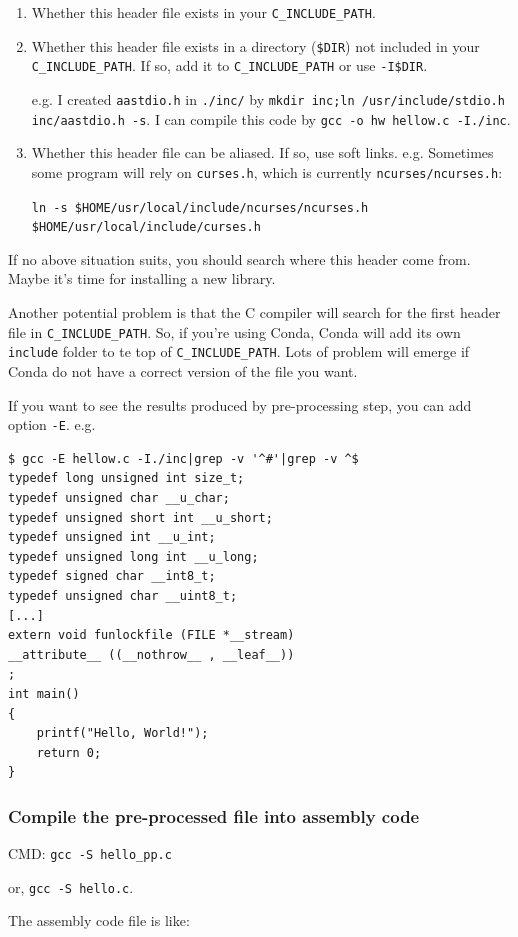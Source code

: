 \documentclass[]{article}
\begin{document}
\begin{enumerate}
\item Whether this header file exists in your \verb|C_INCLUDE_PATH|.
\item Whether this header file exists in a directory (\verb|$DIR|) not included in your \verb|C_INCLUDE_PATH|. If so, add it to \verb|C_INCLUDE_PATH| or use \verb|-I$DIR|.

e.g. I created \verb|aastdio.h| in \verb|./inc/| by \verb|mkdir inc;ln /usr/include/stdio.h inc/aastdio.h -s|. I can compile this code by \verb|gcc -o hw hellow.c -I./inc|.
\item Whether this header file can be aliased. If so, use soft links. e.g. Sometimes some program will rely on \verb|curses.h|, which is currently \verb|ncurses/ncurses.h|:

\verb|ln -s $HOME/usr/local/include/ncurses/ncurses.h $HOME/usr/local/include/curses.h|
\end{enumerate}
If no above situation suits, you should search where this header come from. Maybe it's time for installing a new library.

Another potential problem is that the C compiler will search for the first header file in \verb|C_INCLUDE_PATH|. So, if you're using Conda, Conda will add its own \verb|include| folder to te top of \verb|C_INCLUDE_PATH|. Lots of problem will emerge if Conda do not have a correct version of the file you want.

If you want to see the results produced by pre-processing step, you can add option \verb|-E|. e.g.
\begin{verbatim}
$ gcc -E hellow.c -I./inc|grep -v '^#'|grep -v ^$
typedef long unsigned int size_t;
typedef unsigned char __u_char;
typedef unsigned short int __u_short;
typedef unsigned int __u_int;
typedef unsigned long int __u_long;
typedef signed char __int8_t;
typedef unsigned char __uint8_t;
[...]
extern void funlockfile (FILE *__stream)
__attribute__ ((__nothrow__ , __leaf__))
;
int main()
{
    printf("Hello, World!");
    return 0;
}
\end{verbatim}
\subsubsection{Compile the pre-processed file into assembly code}

CMD: \verb|gcc -S hello_pp.c|

or, \verb|gcc -S hello.c|.

The assembly code file is like:
\end{document}

